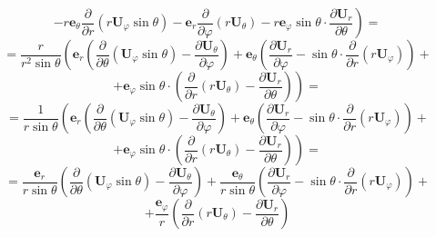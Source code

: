 \documentclass{article}
\begin{document}
\begin{enumerate}
{$$\left.-r \textbf{e}_\theta \dfrac {\partial}{\partial r} \left(r\textbf{U}_\varphi\sin{\theta}\right) - \textbf{e}_r\dfrac{\partial}{\partial\varphi}\left(r\textbf{U}_\theta\right)-r\textbf{e}_\varphi\sin{\theta}\cdot\dfrac{\partial\textbf{U}_r}{\partial\theta}\right)=$$
$$=\dfrac{r}{r^2\sin{\theta}}\left(\textbf{e}_r\left(\dfrac{\partial}{\partial\theta}\left(\textbf{U}_\varphi\sin{\theta}\right)-\dfrac{\partial\textbf{U}_\theta}{\partial\varphi}\right)+\textbf{e}_\theta\left(\dfrac{\partial\textbf{U}_r}{\partial\varphi}-\sin{\theta}\cdot\dfrac{\partial}{\partial r}\left(r\textbf{U}_\varphi\right)\right)+\right.$$
$$\left.+\textbf{e}_\varphi\sin{\theta}\cdot\left(\dfrac{\partial}{\partial r}\left(r\textbf{U}_\theta\right)-\dfrac{\partial\textbf{U}_r}{\partial\theta}\right)\right)=$$
$$=\dfrac{1}{r\sin{\theta}}\left(\textbf{e}_r\left(\dfrac{\partial}{\partial\theta}\left(\textbf{U}_\varphi\sin{\theta}\right)-\dfrac{\partial\textbf{U}_\theta}{\partial\varphi}\right)+\textbf{e}_\theta\left(\dfrac{\partial\textbf{U}_r}{\partial\varphi}-\sin{\theta}\cdot\dfrac{\partial}{\partial r}\left(r\textbf{U}_\varphi\right)\right)+\right.$$
$$\left.+\textbf{e}_\varphi\sin{\theta}\cdot\left(\dfrac{\partial}{\partial r}\left(r\textbf{U}_\theta\right)-\dfrac{\partial\textbf{U}_r}{\partial\theta}\right)\right)=$$
$$=\dfrac{\textbf{e}_r}{r\sin{\theta}}\left(\dfrac{\partial}{\partial\theta}\left(\textbf{U}_\varphi\sin{\theta}\right)-\dfrac{\partial\textbf{U}_\theta}{\partial\varphi}\right)+\dfrac{\textbf{e}_\theta}{r\sin{\theta}}\left(\dfrac{\partial\textbf{U}_r}{\partial\varphi}-\sin{\theta}\cdot\dfrac{\partial}{\partial r}\left(r\textbf{U}_\varphi\right)\right)+$$
$$+\dfrac{\textbf{e}_\varphi}{r}\left(\dfrac{\partial}{\partial r}\left(r\textbf{U}_\theta\right)-\dfrac{\partial\textbf{U}_r}{\partial\theta}\right)$$
  }
\end{enumerate}
\end{document}
